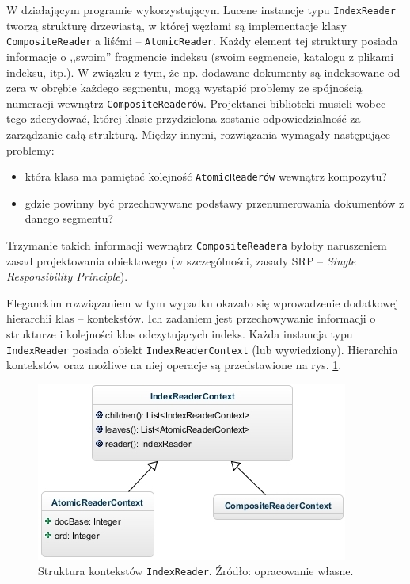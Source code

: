 W działającym programie wykorzystującym Lucene instancje typu \texttt{IndexReader} tworzą strukturę drzewiastą, w której węzłami są implementacje klasy \texttt{CompositeReader} a liśćmi -- \texttt {AtomicReader}. Każdy element tej struktury posiada informacje o ,,swoim'' fragmencie indeksu (swoim segmencie, katalogu z plikami indeksu, itp.). W związku z tym, że np. dodawane dokumenty są indeksowane od zera w obrębie każdego segmentu, mogą wystąpić problemy ze spójnością numeracji wewnątrz \texttt{CompositeReaderów}. Projektanci biblioteki musieli wobec tego zdecydować, której klasie przydzielona zostanie odpowiedzialność za zarządzanie całą strukturą. Między innymi, rozwiązania wymagały następujące problemy: 
\begin{itemize}  
 \item która klasa ma pamiętać kolejność \texttt{AtomicReaderów} wewnątrz kompozytu?
 \item gdzie powinny być przechowywane podstawy przenumerowania dokumentów z danego segmentu?
\end{itemize}
Trzymanie takich informacji wewnątrz \texttt{CompositeReadera} byłoby naruszeniem zasad projektowania obiektowego (w szczególności, zasady SRP -- \emph{Single Responsibility Principle}).

Eleganckim rozwiązaniem w tym wypadku okazało się wprowadzenie dodatkowej hierarchii klas -- kontekstów. Ich zadaniem jest przechowywanie informacji o strukturze i kolejności klas odczytujących indeks. Każda instancja typu \texttt{IndexReader} posiada obiekt \texttt{IndexReaderContext} (lub wywiedziony). Hierarchia kontekstów oraz możliwe na niej operacje są przedstawione na rys. \ref{fig:indexReaderContexts}. 

\begin{figure}[here]
 \centering
 \includegraphics[scale=0.7]{pictures/ReaderContexts.jpg}
 \caption{Struktura kontekstów \texttt{IndexReader}. Źródło: opracowanie własne. \label{fig:indexReaderContexts}}
\end{figure}

